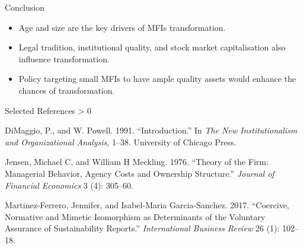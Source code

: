 \documentclass[
  ignorenonframetext,
]{beamer}
\newlength{\cslhangindent}
\newenvironment{CSLReferences}[2] %
 {%
  \setlength{\parindent}{0pt}
  \ifodd #1 \everypar{\setlength{\hangindent}{\cslhangindent}}\ignorespaces\fi
  \ifnum #2 > 0
  \setlength{\parskip}{#2\baselineskip}
  \fi
 }%
 {}
\begin{document}
\begin{frame}{Conclusion}
\protect\hypertarget{conclusion}{}
\begin{itemize}
\item
  Age and size are the key drivers of MFIs transformation.
\item
  Legal tradition, institutional quality, and stock market
  capitalisation also influence transformation.
\item
  Policy targeting small MFIs to have ample quality assets would enhance
  the chances of transformation.
\end{itemize}
\end{frame}

\begin{frame}{Selected References}
\protect\hypertarget{selected-references}{}
\hypertarget{refs}{}
\begin{CSLReferences}{1}{0}
\leavevmode\hypertarget{ref-maggio1991}{}%
DiMaggio, P., and W. Powell. 1991. {``Introduction.''} In \emph{The New
Institutionalism and Organizational Analysis}, 1--38. University of
Chicago Press.

\leavevmode\hypertarget{ref-jensen1976theory}{}%
Jensen, Michael C, and William H Meckling. 1976. {``Theory of the Firm:
Managerial Behavior, Agency Costs and Ownership Structure.''}
\emph{Journal of Financial Economics} 3 (4): 305--60.

\leavevmode\hypertarget{ref-martinez2017coercive}{}%
Martinez-Ferrero, Jennifer, and Isabel-Maria Garcia-Sanchez. 2017.
{``Coercive, Normative and Mimetic Isomorphism as Determinants of the
Voluntary Assurance of Sustainability Reports.''} \emph{International
Business Review} 26 (1): 102--18.

\end{CSLReferences}
\end{frame}
\end{document}
